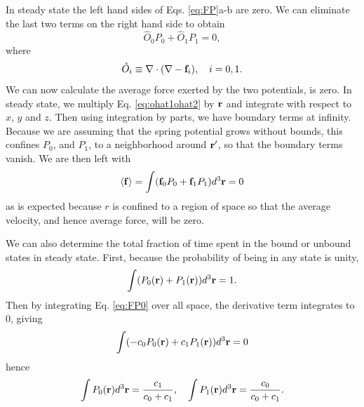 \documentclass[11pt]{ucthesis}
\def\br{{\bf r}}
\def\bof{{\bf f}}
\def\Ohat{\hat O}
\begin{document}
In steady state the left hand sides of Eqs. \ref{eq:FP}a-b are zero. We can
eliminate the last two terms on the right hand side to obtain
\begin{equation}
\label{eq:ohat1ohat2}
\Ohat_0 P_0 + \Ohat_1 P_1 = 0,
\end{equation}
where 
\begin{equation}
\label{eq:Ohatdefn}
\Ohat_i \equiv \nabla \cdot (\nabla - \bof_i), ~~~ i=0,1.
\end{equation}
We can now calculate the average force exerted by the two potentials, is zero. In steady
state, we multiply Eq. \ref{eq:ohat1ohat2} by $\br$ and integrate with respect to $x$, $y$
and $z$. Then using integration by parts, we have boundary terms at infinity.
Because we are assuming that the spring potential grows without bounds, this
confines $P_0$, and $P_1$, to a neighborhood around $\br'$, so that the boundary
terms vanish. We are then left with
\begin{equation}
\label{eq:P0plusP1}
\langle \bof\rangle = \int (\bof_0 P_0 + \bof_1 P_1) d^3\br = 0
\end{equation}
as is expected because $r$ is confined to a region of space so that the average
velocity, and hence average force, will be zero. 

We can also determine the total fraction of time spent in the bound or unbound
states in steady state. First, because the probability of being in any state is unity,
\begin{equation}
\int (P_0(\br) + P_1(\br)) d^3\br = 1 .
\end{equation}
Then by integrating Eq. \ref{eq:FP0} over all space, the derivative term
integrates to 0, giving
\begin{equation}
\int (-c_0 P_0(\br) + c_1 P_1(\br)) d^3\br = 0
\end{equation}
hence
\begin{equation}
\label{eq:norms}
\int P_0(\br) d^3\br = \frac{c_1}{c_0+c_1}, ~~~
\int P_1(\br) d^3\br = \frac{c_0}{c_0+c_1} .
\end{equation}
\end{document}

